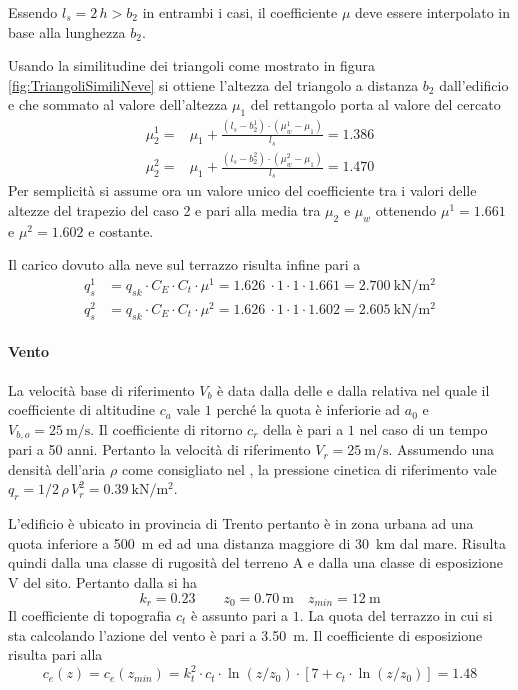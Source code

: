 Essendo $l_s=2\,h>b_2$ in entrambi i casi, il coefficiente $\mu$ deve essere interpolato in base alla lunghezza $b_2$. 

Usando la similitudine dei triangoli come mostrato in figura \ref{fig:TriangoliSimiliNeve} si ottiene l'altezza del triangolo a distanza $b_2$ dall'edificio e che sommato al valore dell'altezza $\mu_1$ del rettangolo porta al valore del  cercato 
\begin{align*}
	\mu_2^{1}=&\mu_1 + \frac{(l_s - b_2^1)\cdot (\mu_w^1-\mu_1)}{l_s} = 1.386\\
	\mu_2^{2}=&\mu_1 + \frac{(l_s - b_2^2)\cdot (\mu_w^2-\mu_1)}{l_s} =	1.470
\end{align*}
Per semplicità si assume ora un valore unico del coefficiente tra i valori delle altezze del trapezio del caso 2 e pari alla media tra $\mu_2$ e $\mu_w$ ottenendo $\mu^1= 1.661$ e $\mu^2=1.602$ e costante.

Il carico dovuto alla neve sul terrazzo risulta infine pari a 
\begin{align}
q_s^1 &= q_{sk} \cdot C_E \cdot C_t \cdot \mu^1 = \SI{1.626}{} \cdot 1 \cdot 1 \cdot 1.661 = \SI{2.700}{\kilo\newton\per\square\meter}\\
q_s^2 &= q_{sk} \cdot C_E \cdot C_t \cdot \mu^2 = \SI{1.626}{} \cdot 1 \cdot 1 \cdot 1.602 = \SI{2.605}{\kilo\newton\per\square\meter}\label{eq:qneve}
\end{align}
\paragraph*{Vento} \label{cap:ventoTerrazzo} 
La velocità base di riferimento $V_b$ è data dalla  delle  e dalla relativa  nel quale il coefficiente di altitudine $c_a$ vale $1$ perché la quota è inferiorie ad $a_0$ e $V_{b,o}=\SI{25}{\meter\per\second}$. 
Il coefficiente di ritorno $c_r$ della  è pari a $1$ nel caso di un tempo pari a 50 anni. 
Pertanto la velocità di riferimento $V_r=\SI{25}{\meter\per\second}$.
Assumendo una densità dell'aria $\rho$ come consigliato nel , la pressione cinetica di riferimento vale $q_r =1/2\, \rho\, V_r^2 = \SI{0.39}{\kilo\newton\per\square\meter}$. 

L'edificio è ubicato in provincia di Trento pertanto è in zona urbana ad una quota inferiore a \SI{500}{\meter} ed ad una distanza maggiore di \SI{30}{\kilo\meter} dal mare. 
Risulta quindi dalla  una classe di rugosità del terreno A e dalla  una classe di esposizione V del sito.
Pertanto dalla  si ha
\[
	k_r=0.23 \qquad z_0=\SI{0.70}{\meter} \quad z_{min}=\SI{12}{\meter}
\]
Il coefficiente di topografia $c_t$ è assunto pari a $1$.
La quota del terrazzo in cui si sta calcolando l'azione del vento è pari a \SI{3.50}{\meter}.
Il coefficiente di esposizione risulta pari alla  
\[
	c_e(z)=c_e(z_{min})=k_t^2\cdot c_t \cdot \ln(z/z_0)\cdot[7+c_t\cdot\ln (z/z_0)] = 1.48
\]

